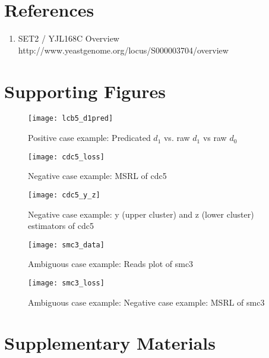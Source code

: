 \documentclass{article}
\begin{document}
\newpage
\section{References}
\begin{enumerate}
	\item SET2 / YJL168C Overview\\ http://www.yeastgenome.org/locus/S000003704/overview
\end{enumerate}


\section{Supporting Figures}


\begin{figure}[h]
	\texttt{[image: lcb5\_d1pred]}
	\caption{Positive case example: Predicated $d_1$ vs. raw $d_1$ vs raw $d_0$}
	\label{lcb5d1pred}
\end{figure}


\begin{figure}[h]
	\texttt{[image: cdc5\_loss]}
	\caption{Negative case example: MSRL of cdc5}
	\label{cdc5loss}
\end{figure}

\begin{figure}[h]
	\texttt{[image: cdc5\_y\_z]}
	\caption{Negative case example: y (upper cluster) and z (lower cluster) estimators of cdc5}
	\label{cdc5yz}
\end{figure}

\begin{figure}[h]
	\texttt{[image: smc3\_data]}
	\caption{Ambiguous case example: Reads plot of smc3}
	\label{smc3data}
\end{figure}

\begin{figure}[h]
	\texttt{[image: smc3\_loss]}
	\caption{Ambiguous case example: Negative case example: MSRL of smc3}
	\label{smc3loss}
\end{figure}




\newpage
\section{Supplementary Materials}
\end{document}
